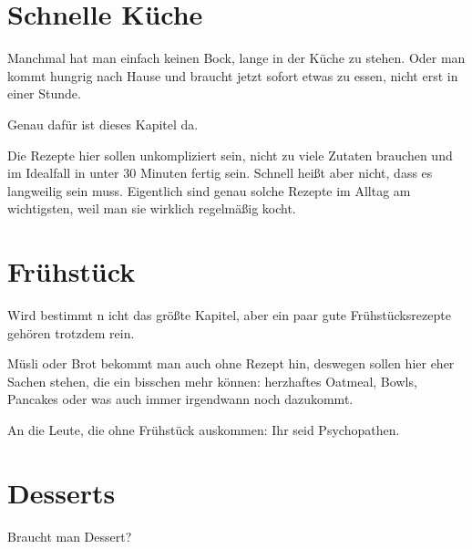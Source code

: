 \documentclass[
a4paper,
11pt
]{article}
\begin{document}

\section{Schnelle Küche}

Manchmal hat man einfach keinen Bock, lange in der Küche zu stehen. Oder man kommt hungrig nach Hause und braucht jetzt sofort etwas zu essen, nicht erst in einer Stunde.

Genau dafür ist dieses Kapitel da.

Die Rezepte hier sollen unkompliziert sein, nicht zu viele Zutaten brauchen und im Idealfall in unter 30 Minuten fertig sein. Schnell heißt aber nicht, dass es langweilig sein muss. Eigentlich sind genau solche Rezepte im Alltag am wichtigsten, weil man sie wirklich regelmäßig kocht.

\mylocaltableofcontents%
\newpage









\section{Frühstück}

Wird bestimmt n
icht das größte Kapitel, aber ein paar gute Frühstücksrezepte gehören trotzdem rein.

Müsli oder Brot bekommt man auch ohne Rezept hin, deswegen sollen hier eher Sachen stehen, die ein bisschen mehr können: herzhaftes Oatmeal, Bowls, Pancakes oder was auch immer irgendwann noch dazukommt.

An die Leute, die ohne Frühstück auskommen: Ihr seid Psychopathen.

\mylocaltableofcontents%
\newpage






\section{Desserts}
Braucht man Dessert?
\end{document}
